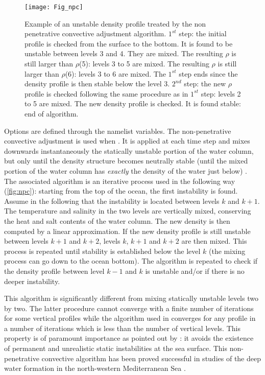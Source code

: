 \documentclass[../main/NEMO_manual]{subfiles}
\begin{document}
\begin{figure}[!htb]
  \begin{center}
    \texttt{[image: Fig\_npc]}
    \caption{
      \protect\label{fig:npc}
      Example of an unstable density profile treated by the non penetrative convective adjustment algorithm.
      $1^{st}$ step: the initial profile is checked from the surface to the bottom.
      It is found to be unstable between levels 3 and 4.
      They are mixed.
      The resulting $\rho$ is still larger than $\rho$(5): levels 3 to 5 are mixed.
      The resulting $\rho$ is still larger than $\rho$(6): levels 3 to 6 are mixed.
      The $1^{st}$ step ends since the density profile is then stable below the level 3.
      $2^{nd}$ step: the new $\rho$ profile is checked following the same procedure as in $1^{st}$ step:
      levels 2 to 5 are mixed.
      The new density profile is checked.
      It is found stable: end of algorithm.
    }
  \end{center}
\end{figure}

Options are defined through the  namelist variables.
The non-penetrative convective adjustment is used when .
It is applied at each  time step and mixes downwards instantaneously the statically unstable portion of
the water column, but only until the density structure becomes neutrally stable
(\ie until the mixed portion of the water column has \textit{exactly} the density of the water just below)
\citep{Madec_al_JPO91}.
The associated algorithm is an iterative process used in the following way (\autoref{fig:npc}):
starting from the top of the ocean, the first instability is found.
Assume in the following that the instability is located between levels $k$ and $k+1$.
The temperature and salinity in the two levels are vertically mixed, conserving the heat and salt contents of
the water column.
The new density is then computed by a linear approximation.
If the new density profile is still unstable between levels $k+1$ and $k+2$,
levels $k$, $k+1$ and $k+2$ are then mixed.
This process is repeated until stability is established below the level $k$
(the mixing process can go down to the ocean bottom).
The algorithm is repeated to check if the density profile between level $k-1$ and $k$ is unstable and/or
if there is no deeper instability.

This algorithm is significantly different from mixing statically unstable levels two by two.
The latter procedure cannot converge with a finite number of iterations for some vertical profiles while
the algorithm used in \NEMO converges for any profile in a number of iterations which is less than
the number of vertical levels.
This property is of paramount importance as pointed out by \citet{Killworth1989}:
it avoids the existence of permanent and unrealistic static instabilities at the sea surface.
This non-penetrative convective algorithm has been proved successful in studies of the deep water formation in
the north-western Mediterranean Sea \citep{Madec_al_JPO91, Madec_al_DAO91, Madec_Crepon_Bk91}.
\end{document}
